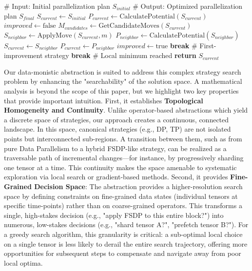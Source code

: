 \documentclass[letterpaper,twocolumn,10pt]{article}
\begin{document}
\begin{algorithm}[h]
\caption{Structured Local Search for Strategy Discovery}
\label{alg:structured_search}
\begin{algorithmic}[1]
\STATE \# Input: Initial parallelization plan $S_{initial}$
\STATE \# Output: Optimized parallelization plan $S_{final}$
\STATE $S_{current} \gets S_{initial}$
\STATE $P_{current} \gets \text{CalculatePotential}(S_{current})$
  \STATE $improved \gets \text{false}$
  \STATE $M_{candidates} \gets \text{GetCandidateMoves}(S_{current})$
    \STATE $S_{neighbor} \gets \text{ApplyMove}(S_{current}, m)$
    \STATE $P_{neighbor} \gets \text{CalculatePotential}(S_{neighbor})$
      \STATE $S_{current} \gets S_{neighbor}$
      \STATE $P_{current} \gets P_{neighbor}$
      \STATE $improved \gets \text{true}$
      \STATE \textbf{break} \# First-improvement strategy
    \ENDIF
  \ENDFOR
    \STATE \textbf{break} \# Local minimum reached
  \ENDIF
\ENDFOR
\STATE \textbf{return} $S_{current}$
\end{algorithmic}
\end{algorithm}



Our data-monistic abstraction is suited to address this complex strategy search problem by enhancing the "searchability" of the solution space. A mathematical analysis is beyond the scope of this paper, but we highlight two key properties that provide important intuition. First, it establishes \textbf{Topological Homogeneity and Continuity}. Unlike operator-based abstractions which yield a discrete space of strategies, our approach creates a continuous, connected landscape. In this space, canonical strategies (e.g., DP, TP) are not isolated points but interconnected sub-regions. A transition between them, such as from pure Data Parallelism to a hybrid FSDP-like strategy, can be realized as a traversable path of incremental changes—for instance, by progressively sharding one tensor at a time. This continuity makes the space amenable to systematic exploration via local search or gradient-based methods. Second, it provides \textbf{Fine-Grained Decision Space}: The abstraction provides a higher-resolution search space by defining constraints on fine-grained data states (individual tensors at specific time-points) rather than on coarse-grained operators. This transforms a single, high-stakes decision (e.g., "apply FSDP to this entire block?") into numerous, low-stakes decisions (e.g., "shard tensor A?", "prefetch tensor B?"). For a greedy search algorithm, this granularity is critical: a sub-optimal local choice on a single tensor is less likely to derail the entire search trajectory, offering more opportunities for subsequent steps to compensate and navigate away from poor local optima.
\end{document}
